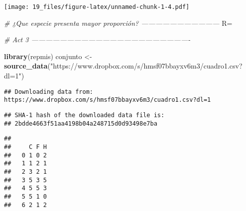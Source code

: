 \documentclass[
]{article}
\newenvironment{Shaded}{\begin{snugshade}}{\end{snugshade}}
\newcommand{\CommentTok}[1]{\textcolor[rgb]{0.56,0.35,0.01}{\textit{#1}}}
\newcommand{\DataTypeTok}[1]{\textcolor[rgb]{0.13,0.29,0.53}{#1}}
\newcommand{\KeywordTok}[1]{\textcolor[rgb]{0.13,0.29,0.53}{\textbf{#1}}}
\newcommand{\NormalTok}[1]{#1}
\newcommand{\OperatorTok}[1]{\textcolor[rgb]{0.81,0.36,0.00}{\textbf{#1}}}
\newcommand{\StringTok}[1]{\textcolor[rgb]{0.31,0.60,0.02}{#1}}
\begin{document}
\texttt{[image: 19\_files/figure-latex/unnamed-chunk-1-4.pdf]}

\begin{Shaded}
\begin{Highlighting}[]
\CommentTok{# ¿Que especie presenta mayor proporción? ---------------------------------}
\NormalTok{R=}\StringTok{ }



\CommentTok{# Act 3 -------------------------------------------------------------------}


\StringTok{  }\KeywordTok{library}\NormalTok{(repmis)}
\NormalTok{conjunto <-}\StringTok{ }\KeywordTok{source_data}\NormalTok{(}\StringTok{"https://www.dropbox.com/s/hmsf07bbayxv6m3/cuadro1.csv?dl=1"}\NormalTok{) }
\end{Highlighting}
\end{Shaded}

\begin{verbatim}
## Downloading data from: https://www.dropbox.com/s/hmsf07bbayxv6m3/cuadro1.csv?dl=1
\end{verbatim}

\begin{verbatim}
## SHA-1 hash of the downloaded data file is:
## 2bdde4663f51aa4198b04a248715d0d93498e7ba
\end{verbatim}

\begin{Shaded}
\end{Shaded}

\begin{verbatim}
##    
##     C F H
##   0 1 0 2
##   1 1 2 1
##   2 3 2 1
##   3 5 3 5
##   4 5 5 3
##   5 5 1 0
##   6 2 1 2
\end{verbatim}

\begin{Shaded}
\end{Shaded}
\end{document}
